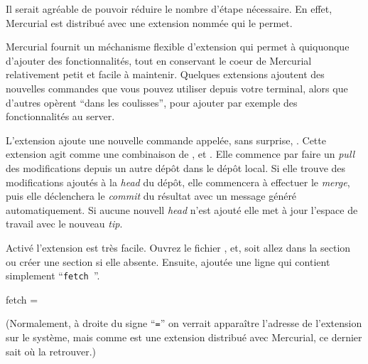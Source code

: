 Il serait agréable de pouvoir réduire le nombre d'étape nécessaire.
En effet, Mercurial est distribué avec une extension nommée 
qui le permet.

Mercurial fournit un méchanisme flexible d'extension qui permet à 
quiquonque d'ajouter des fonctionnalités, tout en conservant le 
coeur de Mercurial relativement petit et facile à maintenir. Quelques
extensions ajoutent des nouvelles commandes que vous pouvez utiliser
depuis votre terminal, alors que d'autres opèrent ``dans les coulisses'',
pour ajouter par exemple des fonctionnalités au server.

L'extension  ajoute une nouvelle commande appelée, sans
surprise, . Cette extension agit comme une combinaison
de ,  et . Elle commence
par faire un \textit{pull} des modifications depuis un autre dépôt dans
le dépôt local. Si elle trouve des modifications ajoutés à la \textit{head}
du dépôt, elle commencera à effectuer le \textit{merge}, puis elle 
déclenchera le \textit{commit} du résultat avec un message généré
automatiquement. Si aucune nouvell \textit{head} n'est ajouté elle
met à jour l'espace de travail avec le nouveau \textit{tip}.

Activé l'extension  est très facile. Ouvrez le fichier
, et, soit allez dans la section 
ou créer une section  si elle absente. Ensuite, 
ajoutée une ligne qui contient simplement ``\Verb+fetch +''.
\begin{codesample2}
  [extensions]
  fetch =
\end{codesample2}
(Normalement, à droite du signe ``\texttt{=}'' on verrait apparaître
l'adresse de l'extension sur le système, mais comme  est
une extension distribué avec Mercurial, ce dernier sait où la 
retrouver.)

